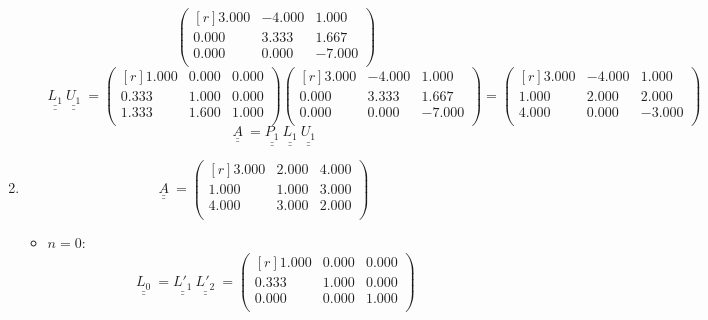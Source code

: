 \documentclass{report}[10pts]
\begin{document}
\begin{enumerate}[- Ex. 1]
\begin{itemize}
\[\begin{pmatrix*}[r]
         3.000 & -4.000 & 1.000\\
         0.000 & 3.333 & 1.667\\
         0.000 & 0.000 & -7.000\\
      \end{pmatrix*}
\]
\[
   \underline{\underline{L_{1}}}~
   \underline{\underline{U_{1}}}~
   =
      \begin{pmatrix*}[r]
         1.000 & 0.000 & 0.000\\
         0.333 & 1.000 & 0.000\\
         1.333 & 1.600 & 1.000\\
      \end{pmatrix*}
      \begin{pmatrix*}[r]
         3.000 & -4.000 & 1.000\\
         0.000 & 3.333 & 1.667\\
         0.000 & 0.000 & -7.000\\
      \end{pmatrix*}
   =
      \begin{pmatrix*}[r]
         3.000 & -4.000 & 1.000\\
         1.000 & 2.000 & 2.000\\
         4.000 & 0.000 & -3.000\\
      \end{pmatrix*}
\]
\[
   \underline{\underline{A}}~
   =
   \underline{\underline{P_{1}}}~
   \underline{\underline{L_{1}}}~
   \underline{\underline{U_{1}}}~
\]
\end{itemize}
\clearpage
\item
\[
   \underline{\underline{A}}~
   =
      \begin{pmatrix*}[r]
         3.000 & 2.000 & 4.000\\
         1.000 & 1.000 & 3.000\\
         4.000 & 3.000 & 2.000\\
      \end{pmatrix*}
\]
\begin{itemize}
\item $n=0$:
\[
   \underline{\underline{L_{0}}}~
   =
   \underline{\underline{L'_{1}}}~
   \underline{\underline{L'_{2}}}~
   =
      \begin{pmatrix}[r]
         1.000 & 0.000 & 0.000\\
         0.333 & 1.000 & 0.000\\
         0.000 & 0.000 & 1.000\\
      \end{pmatrix}
\]
\end{itemize}
\end{enumerate}
\end{document}
